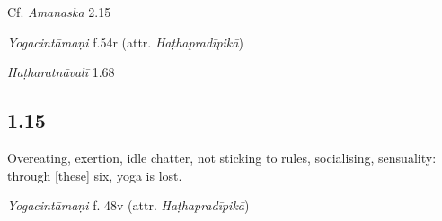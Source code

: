 \begin{ekdosis}
\begin{sources}[hp01_014]
Cf. \emph{Amanaska} 2.15

\begin{versinnote}
\end{versinnote}

\end{sources}

\begin{testimonia}[hp01_014]
\emph{Yogacintāmaṇi} f.54r (attr. \emph{Haṭhapradīpikā})

\begin{versinnote}
\end{versinnote}

\emph{Haṭharatnāvalī} 1.68

\begin{versinnote}
\end{versinnote}

\end{testimonia}


\subsection*{1.15}
\begin{translation}[hp01_015]
Overeating, exertion, idle chatter, not sticking to rules, socialising, sensuality: through [these] six, yoga is lost.
\end{translation}

\begin{testimonia}[hp01_015]
\emph{Yogacintāmaṇi} f. 48v (attr. \emph{Haṭhapradīpikā})

\begin{versinnote}
\end{versinnote}


\end{testimonia}
\end{ekdosis}
